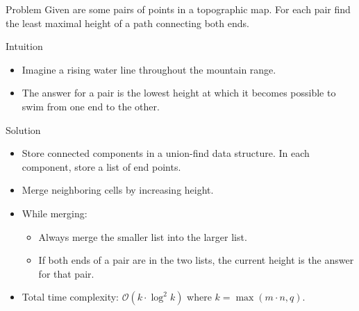 \begin{slide}
  \begin{block}{Problem}
    Given are some pairs of points in a topographic map. For each pair
    find the least maximal height of a path connecting both ends.
  \end{block}
  \pause
  \begin{block}{Intuition}
    \begin{itemize}
      \item Imagine a rising water line throughout the mountain range.
      \item The answer for a pair is the lowest height at which it
        becomes possible to swim from one end to the other.
    \end{itemize}
  \end{block}
\end{slide}
\begin{slide}
  \begin{block}{Solution}
    \begin{itemize}
      \item Store connected components in a union-find data structure.
        In each component, store a list of end points.
      \item Merge neighboring cells by increasing height.
      \item While merging:
        \begin{itemize}
          \item Always merge the smaller list into the larger list.
          \item If both ends of a pair are in the two lists, the
            current height is the answer for that pair.
        \end{itemize}
      \item Total time complexity: $\mathcal{O}(k\cdot\log^2 k)$ where
        $k = \max(m\cdot n,q)$.
    \end{itemize}
  \end{block}
\end{slide}
